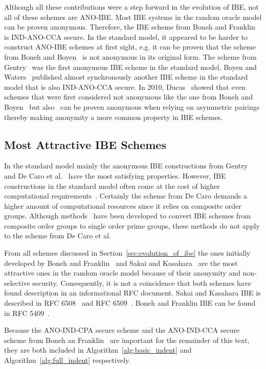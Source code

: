 Although all these contributions were a step forward in the evolution of IBE, not all of these schemes are ANO-IBE. Most IBE systems in the random oracle model can be proven anonymous. Therefore, the IBE scheme from Boneh and Franklin~\cite{art:BonehF01} is IND-ANO-CCA secure. In the standard model, it appeared to be harder to construct ANO-IBE schemes at first sight, e.g. it can be proven that the scheme from Boneh and Boyen~\cite{art:BonehB04} is not anonymous in its original form. The scheme from Gentry~\cite{art:Gentry06} was the first anonymous IBE scheme in the standard model. Boyen and Waters~\cite{art:BoyenW06} published almost synchronously another IBE scheme in the standard model that is also IND-ANO-CCA secure. In 2010, Ducas~\cite{art:Ducas10} showed that even schemes that were first considered not anonymous like the one from Boneh and Boyen~\cite{art:BonehB04} but also~\cite{art:BonehBG05,art:Waters05} can be proven anonymous when relying on asymmetric pairings thereby making anonymity a more common property in IBE schemes.

\subsection{Most Attractive IBE Schemes}
In the standard model mainly the anonymous IBE constructions from Gentry~\cite{art:Gentry06} and De Caro et al.~\cite{art:CaroIP10} have the most satisfying properties. However, IBE constructions in the standard model often come at the cost of higher computational requirements~\cite{art:Boyen08}. Certainly the scheme from De Caro demands a higher amount of computational resources since it relies on composite order groups. Although methods~\cite{art:Freeman10,art:Lewko12} have been developed to convert IBE schemes from composite order groups to single order prime groups, these methods do not apply to the scheme from De Caro et al.~\cite{art:LeeL10}

From all schemes discussed in Section~\ref{sec:evolution_of_ibe} the ones initially developed by Boneh and Franklin~\cite{art:BonehF01} and Sakai and Kasahara~\cite{art:SakaiK03} are the most attractive ones in the random oracle model because of their anonymity and non-selective security. Consequently, it is not a coincidence that both schemes have found description in an informational RFC document. Sakai and Kasahara IBE is described in RFC 6508~\cite{rfc6508} and RFC 6509~\cite{rfc6509}. Boneh and Franklin IBE can be found in RFC 5409~\cite{rfc5409}. 

Because the ANO-IND-CPA secure scheme and the ANO-IND-CCA secure scheme from Boneh an Franklin~\cite{art:BonehF01} are important for the remainder of this text, they are both included in Algorithm~\ref{alg:basic_indent} and Algorithm~\ref{alg:full_indent} respectively.

